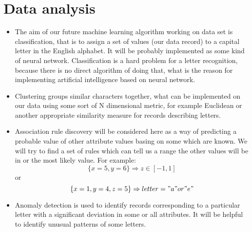 \section*{Data analysis}
\begin{itemize}
\item The aim of our future machine learning algorithm working on data set is
classification, that is to assign a set of values (our data record) to a
capital letter in the English alphabet. It will be probably implemented as
some kind of neural network. Classification is a hard problem for a letter
recognition, because there is no direct algorithm of doing that, what is the
reason for implementing artificial intelligence based on neural network.
\item Clustering groups similar characters together, what can be implemented on
our data using some sort of N dimensional metric, for example Euclidean or
another appropriate similarity measure for records describing letters.
\item Association rule discovery will be considered here as a way of predicting
a probable value of other attribute values basing on some which are known.
We will try to find a set of rules which can tell us a range the other values
will be in or the most likely value. For example:
$$
\{ x = 5, y = 6 \} \Rightarrow z \in [-1,1]
$$
or
$$
\{ x = 1, y = 4, z = 5 \} \Rightarrow letter = "a" or "e"
$$
\item Anomaly detection is used to identify records corresponding to a particular
letter with a significant deviation in some or all attributes. It will be helpful
to identify unusual patterns of some letters.
\end{itemize}

